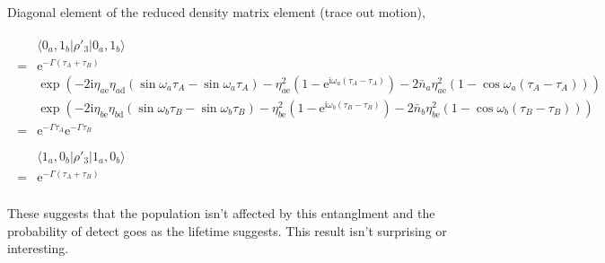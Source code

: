 \documentclass[10pt,fleqn]{article}
\newcommand{\ue}{\mathrm{e}}
\newcommand{\ui}{\mathrm{i}}
\newcommand{\eqar}[1]
{
  \begin{align}
    #1
  \end{align}
}
\newcommand{\paren}[1]{{\left({#1}\right)}}
\begin{document}
Diagonal element of the reduced density matrix element (trace out motion),
\eqar{
  \begin{split}
    &\langle0_a,1_b|\rho'_3|0_a,1_b\rangle\\
    =&\ue^{-\Gamma\paren{\tau_A+\tau_B}}\\
    &\exp\paren{
      -2\ui\eta_{a\mathrm{e}}
      \eta_{a\mathrm{d}}\paren{\sin\omega_a\tau_{A}-\sin\omega_a\tau_{A}}
      -\eta_{a\mathrm{e}}^2\paren{1-\ue^{\ui\omega_a\paren{\tau_{A}-\tau_{A}}}}
      -2{\bar n_a}\eta_{a\mathrm{e}}^2\paren{1-\cos\omega_a\paren{\tau_{A}-\tau_{A}}}
      }\\
    &\exp\paren{
      -2\ui\eta_{b\mathrm{e}}
      \eta_{b\mathrm{d}}\paren{\sin\omega_b\tau_{B}-\sin\omega_b\tau_{B}}
      -\eta_{b\mathrm{e}}^2\paren{1-\ue^{\ui\omega_b\paren{\tau_{B}-\tau_{B}}}}
      -2{\bar n_b}\eta_{b\mathrm{e}}^2\paren{1-\cos\omega_b\paren{\tau_{B}-\tau_{B}}}
      }\\
    =&\ue^{-\Gamma\tau_A}\ue^{-\Gamma\tau_B}\\
  \end{split}\\
  \begin{split}
    &\langle1_a,0_b|\rho'_3|1_a,0_b\rangle\\
    =&\ue^{-\Gamma\paren{\tau_A+\tau_B}}\\
  \end{split}
}
These suggests that the population isn't affected by this entanglment
and the probability of detect goes as the lifetime suggests.
This result isn't surprising or interesting.\\
\end{document}
